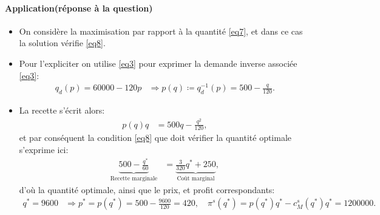 \begin{frame}
  [allowframebreaks]{\insertsection}
  \framesubtitle{Application(réponse à la question)}
  \begin{itemize}
  \item On considère la maximisation par rapport à la quantité \eqref{eq7}, et dans ce cas la solution vérifie \eqref{eq8}.
  \item Pour l'expliciter on utilise \eqref{eq3} pour exprimer la demande inverse associée \eqref{eq3}:
  \begin{align*}
  q_d(p) = 60000 - 120p &\Rightarrow p(q) \coloneqq q_d^{-1}(p) =500- \frac{q}{120}.
  \end{align*}
 \item La recette s'écrit alors:
 \begin{align*}
p(q)q &= 500q -  \frac{q^2}{120},
 \end{align*}
 et par conséquent  la condition \eqref{eq8}  que doit vérifier la quantité optimale s'exprime ici:
 \begin{align*}
\underbrace{ 500 - \frac{q^*}{60}}_{\text{Recette marginale}} &=  \underbrace{\frac{3}{320}q^* + 250}_{\text{Coût marginal}},
 \end{align*}
 d'où la quantité optimale, ainsi que le prix, et profit correspondants:
  \begin{align*}
  q^* = 9600 &\Rightarrow p^*  = p(q^*) = 500 - \frac{9600}{120}= 420, \quad \pi^s(q^*) = p(q^*)q^* - c_M^s(q^*) q^* = 1200000.
   \end{align*}
  \end{itemize}
   \end{frame}
   
